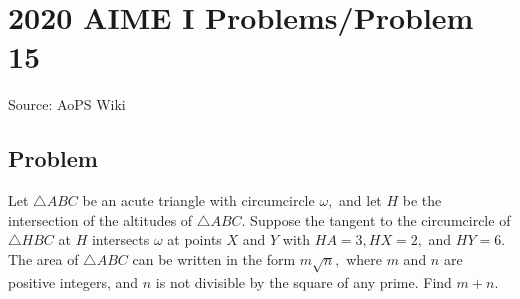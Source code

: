 \documentclass[12pt]{article}
\begin{document}
\section*{{2020 AIME I Problems/Problem 15}}
Source: AoPS Wiki

\subsection*{Problem}
Let $\triangle ABC$ be an acute triangle with circumcircle $\omega,$ and let $H$ be the intersection of the altitudes of $\triangle ABC.$ Suppose the tangent to the circumcircle of $\triangle HBC$ at $H$ intersects $\omega$ at points $X$ and $Y$ with $HA=3,HX=2,$ and $HY=6.$ The area of $\triangle ABC$ can be written in the form $m\sqrt{n},$ where $m$ and $n$ are positive integers, and $n$ is not divisible by the square of any prime. Find $m+n.$
\end{document}

